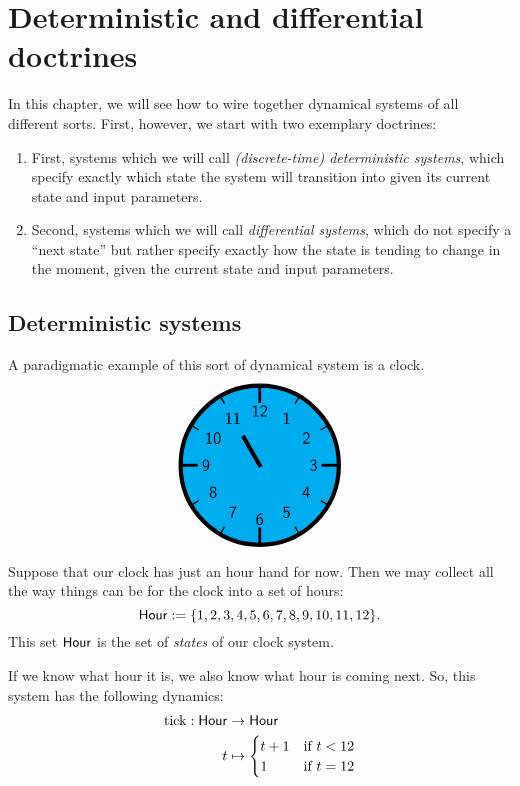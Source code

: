 \documentclass[DynamicalBook]{subfiles}
\begin{document}
\section{Deterministic and differential doctrines}

In this chapter, we will see how to wire together dynamical systems of all
different sorts. First, however, we start with two exemplary doctrines:

\begin{enumerate}
\item First, systems which we will call \emph{(discrete-time) deterministic
    systems}, which specify exactly which state the system will transition into
  given its current state and input parameters.
\item Second, systems which we will call \emph{differential systems}, which do
  not specify a ``next state'' but rather specify exactly how the state is
  tending to change in the moment, given the current state and input parameters.
\end{enumerate}


\subsection{Deterministic systems}\label{sec.deterministic_system}



A paradigmatic example of this sort of dynamical system is a clock.
\[
\begin{tikzpicture}[line cap=rect,line width=3pt]
\filldraw [fill=cyan] (0,0) circle [radius=2cm];
\foreach \angle [count=\xi] in {60,30,...,-270}
{
  \draw[line width=1pt] (\angle:1.8cm) -- (\angle:2cm);
  \node[font=\large] at (\angle:1.36cm) {\textsf{\xi}};
}
\foreach \angle in {0,90,180,270}
  \draw[line width=2pt] (\angle:1.6cm) -- (\angle:2cm);
\draw (0,0) -- (120:0.8cm);
\end{tikzpicture}
\]

Suppose that our clock has just an hour hand for now. Then we may collect all
the way things can be for the clock into a set of hours:
$$\mathsf{Hour} := \{1, 2, 3, 4, 5, 6, 7, 8, 9, 10, 11, 12\}.$$
This set $\mathsf{Hour}$ is the set of \emph{states} of our clock system.

If we know what hour it is, we also know what hour is coming next. So, this system has the following dynamics:
%
%
\begin{align}\label{eqn.tick}
  \mathrm{tick} : \mathsf{Hour} &\to \mathsf{Hour} \\\nonumber
                t &\mapsto \begin{cases} t + 1 &\mbox{if $t < 12$}\\ 1 &\mbox{if $t = 12$}  \end{cases}
\end{align}
\end{document}
